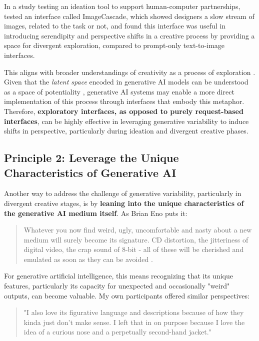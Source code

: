 In a study testing an ideation tool to support human-computer partnerships, \cite{Koch2020-gx} tested an interface called ImageCascade, which showed designers a slow stream of images, related to the task or not, and found this interface was useful in introducing serendipity and perspective shifts in a creative process by providing a space for divergent exploration, compared to prompt-only text-to-image interfaces.

This aligns with broader understandings of creativity as a process of exploration \cite{Boden1998-yn, Wiggins2019-yj}. Given that the \textit{latent space} encoded in generative AI models can be understood as a space of potentiality \cite{Schaerf2024-gf}, generative AI systems may enable a more direct implementation of this process through interfaces that embody this metaphor. Therefore, \textbf{exploratory interfaces, as opposed to purely request-based interfaces}, can be highly effective in leveraging generative variability to induce shifts in perspective, particularly during ideation and divergent creative phases. 


\subsection{Principle 2: Leverage the Unique Characteristics of Generative AI}

Another way to address the challenge of generative variability, particularly in divergent creative stages, is by \textbf{leaning into the unique characteristics of the generative AI medium itself}. As Brian Eno puts it:

\begin{quote}
    Whatever you now find weird, ugly, uncomfortable and nasty about a new medium will surely become its signature. CD distortion, the jitteriness of digital video, the crap sound of 8-bit - all of these will be cherished and emulated as soon as they can be avoided \cite{Eno2007-fl}.
\end{quote}

For generative artificial intelligence, this means recognizing that its unique features, particularly its capacity for unexpected and occasionally "weird" outputs, can become valuable. My own participants offered similar perspectives:

\begin{quote}
"I also love its figurative language and descriptions because of how they kinda just don't make sense. I left that in on purpose because I love the idea of a curious nose and a perpetually second-hand jacket."
\end{quote}

